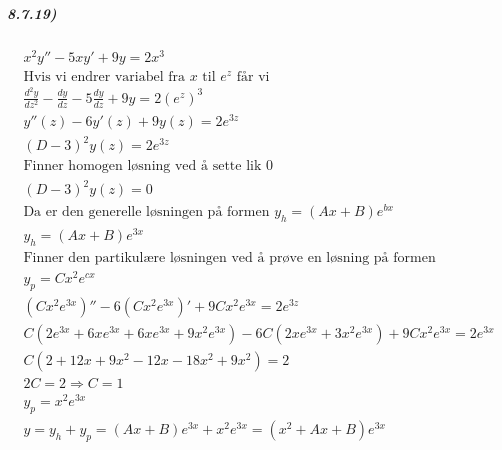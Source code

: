 \documentclass[11pt, A4paper,norsk]{article}
\begin{document}
			\subparagraph{8.7.19)}
				\begin{gather*}
x^2 y'' - 5 x y' + 9 y = 2 x^3 \\
\text{Hvis vi endrer variabel fra $x$ til $e^{z}$ får vi} \\
\frac{d^2 y}{dz^2} - \frac{dy}{dz} - 5 \frac{dy}{dz} + 9y = 2 (e^{z})^3 \\
y''(z) - 6 y'(z) + 9 y(z) = 2 e^{3 z} \\
(D - 3)^2 y(z) = 2 e^{3 z} \\
\text{Finner homogen løsning ved å sette lik $0$} \\
(D - 3)^2 y(z) = 0 \\
\text{Da er den generelle løsningen på formen $y_h = (Ax + B)e^{bx}$} \\
y_h = (Ax + B) e^{3x} \\
\text{Finner den partikulære løsningen ved å prøve en løsning på formen} \\
\text{$y_p = C x^2 e^{cx}$} \\
(C x^2 e^{3x})'' - 6 (C x^2 e^{3x})' + 9 C x^2 e^{3x} = 2 e^{3 z} \\
C ( 2e^{3x} + 6xe^{3x} + 6xe^{3x} + 9x^2e^{3x} ) - 6 C ( 2xe^{3x} + 3x^2e^{3x} ) + 9 C x^2 e^{3x} = 2 e^{3x} \\
C ( 2 + 12x + 9x^2 - 12x - 18x^2 + 9 x^2 ) = 2 \\
2 C = 2 \Rightarrow C = 1 \\
y_p = x^2 e^{3x} \\
y = y_h + y_p = (Ax + B)e^{3x} + x^2 e^{3x} = (x^2 + Ax + B) e^{3x}
				\end{gather*}
\clearpage
\end{document}
